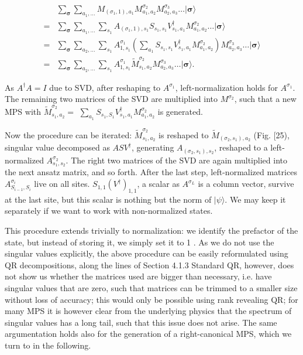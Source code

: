 \documentclass[12pt]{article}
\begin{document}
\begin{align*}
& \sum_{\boldsymbol{\sigma}} \sum_{a_{1}, \ldots} M_{\left(\sigma_{1}, 1\right), a_{1}} M_{a_{1}, a_{2}}^{\sigma_{2}} M_{a_{2}, a_{3}}^{\sigma_{3}} \ldots|\boldsymbol{\sigma}\rangle \\
= & \sum_{\boldsymbol{\sigma}} \sum_{a_{1}, \ldots} \sum_{s_{1}} A_{\left(\sigma_{1}, 1\right), s_{1}} S_{s_{1}, s_{1}} V_{s_{1}, a_{1}}^{\dagger} M_{a_{1}, a_{2}}^{\sigma_{2}} \ldots|\boldsymbol{\sigma}\rangle \\
= & \sum_{\boldsymbol{\sigma}} \sum_{a_{2}, \ldots} \sum_{s_{1}} A_{1, s_{1}}^{\sigma_{1}}\left(\sum_{a_{1}} S_{s_{1}, s_{1}} V_{s_{1}, a_{1}}^{\dagger} M_{a_{1}, a_{2}}^{\sigma_{2}}\right) M_{a_{2}, a_{3}}^{\sigma_{3}} \ldots|\boldsymbol{\sigma}\rangle \\
= & \sum_{\boldsymbol{\sigma}} \sum_{a_{2}, \ldots} \sum_{s_{1}} A_{1, s_{1}}^{\sigma_{1}} \tilde{M}_{s_{1}, a_{2}}^{\sigma_{2}} M_{a_{2}, a_{3}}^{\sigma_{3}} \ldots|\boldsymbol{\sigma}\rangle . \tag{136}
\end{align*}


As $A^{\dagger} A=I$ due to SVD, after reshaping to $A^{\sigma_{1}}$, left-normalization holds for $A^{\sigma_{1}}$. The remaining two matrices of the SVD are multiplied into $M^{\sigma_{2}}$, such that a new MPS with $\tilde{M}_{s_{1}, a_{2}}^{\sigma_{2}}=$ $\sum_{a_{1}} S_{s_{1}, S_{1}} V_{s_{1}, a_{1}}^{\dagger} M_{a_{1}, a_{2}}^{\sigma_{2}}$ is generated.

Now the procedure can be iterated: $\tilde{M}_{s_{1}, a_{2}}^{\sigma_{2}}$ is reshaped to $\tilde{M}_{\left(\sigma_{2}, s_{1}\right), a_{2}}$ (Fig. [25), singular value decomposed as $A S V^{\dagger}$, generating $A_{\left(\sigma_{2}, s_{1}\right), s_{2}}$, reshaped to a left-normalized $A_{s_{1}, s_{2}}^{\sigma_{2}}$. The right two matrices of the SVD are again multiplied into the next ansatz matrix, and so forth. After the last step, left-normalized matrices $A_{S_{i-1}, S_{i}}^{\sigma_{i}}$ live on all sites. $S_{1,1}\left(V^{\dagger}\right)_{1,1}$, a scalar as $A^{\sigma_{L}}$ is a column vector, survive at the last site, but this scalar is nothing but the norm of $|\psi\rangle$. We may keep it separately if we want to work with non-normalized states.

This procedure extends trivially to normalization: we identify the prefactor of the state, but instead of storing it, we simply set it to 1 . As we do not use the singular values explicitly, the above procedure can be easily reformulated using QR decompositions, along the lines of Section 4.1.3 Standard QR, however, does not show us whether the matrices used are bigger than necessary, i.e. have singular values that are zero, such that matrices can be trimmed to a smaller size without loss of accuracy; this would only be possible using rank revealing QR; for many MPS it is however clear from the underlying physics that the spectrum of singular values has a long tail, such that this issue does not arise. The same argumentation holds also for the generation of a right-canonical MPS, which we turn to in the following.
\end{document}
